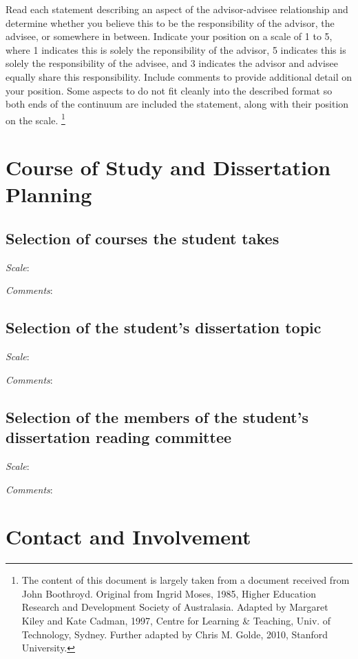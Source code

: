 \documentclass[10pt]{article}
\begin{document}
Read each statement describing an aspect of the advisor-advisee relationship
and determine whether you believe this to be the responsibility of the
advisor, the advisee, or somewhere in between. Indicate your position on
a scale of 1 to 5, where 1 indicates this is solely the reponsibility of
the advisor, 5 indicates this is solely the responsibility of the advisee,
and 3 indicates the advisor and advisee equally share this responsibility.
Include comments to provide additional detail on your position. Some aspects
to do not fit cleanly into the described format so both ends of the continuum
are included the statement, along with their position on the scale.%
\footnote{
The content of this document is largely taken from a document received
from John Boothroyd. Original from Ingrid Moses, 1985, Higher Education
Research and Development Society of Australasia. Adapted by Margaret Kiley
and Kate Cadman, 1997, Centre for Learning \& Teaching, Univ. of Technology,
Sydney. Further adapted by Chris M. Golde, 2010, Stanford University.
}

\section*{Course of Study and Dissertation Planning}

\subsection*{Selection of courses the student takes}
\textit{Scale}: %

\textit{Comments}: %

\subsection*{Selection of the student's dissertation topic}
\textit{Scale}: %

\textit{Comments}: %

\subsection*{Selection of the members of the student's
             dissertation reading committee}
\textit{Scale}: %

\textit{Comments}: %


\section*{Contact and Involvement}
\end{document}
